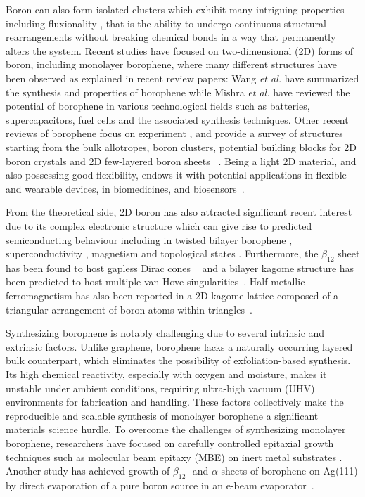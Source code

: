 \documentclass[aps,prb,preprint,notitlepage]{revtex4-2}
\begin{document}
Boron can also form isolated clusters which exhibit many intriguing properties including fluxionality \cite{pan2019fluxional}, that is
the ability to
undergo continuous structural rearrangements without breaking chemical 
bonds in a way that permanently alters the system.
Recent studies have focused on two-dimensional (2D) forms of boron, 
including monolayer borophene, where many different structures have been observed as explained in recent review papers: Wang {\em et al.} \cite{ wang2024borophene} have summarized the synthesis and properties of borophene while Mishra {\em et al. }
\cite{mishra2024borophene}
 have reviewed the potential of borophene in various technological fields such as batteries, supercapacitors, fuel cells and the associated synthesis techniques. Other recent reviews of borophene focus on experiment \cite{mohanty2023review,yang2023borophenes,kumar2024rise, xie2020two}, and provide a survey of structures starting from the bulk allotropes, boron clusters, potential building blocks for 2D boron crystals and 2D few-layered boron sheets ~\cite{sun2017two}.
Being a light 2D material, and also possessing good flexibility, 
endows it with potential applications in flexible and wearable devices, 
in biomedicines, and 
biosensors~\cite{mozvashi2021mechanical,zhang2017elasticity}.

From the theoretical side, 2D boron has also attracted significant recent interest due to its complex electronic structure which can give rise to predicted semiconducting 
behaviour \cite{qureshi2024bilayer} including in twisted bilayer borophene \cite{jin2022tuning}, superconductivity \cite{gao2017prediction,han2023superconducting}, magnetism \cite{zhu2019magnetic}  and topological states
\cite{wang2025second,rakshit2025exploring,wang2019serendipity}.  
Furthermore, the $\beta_{12}$ sheet has been found to host gapless Dirac cones
~\cite{feng2017dirac} and a bilayer kagome structure has been predicted to host
multiple van Hove singularities~\cite{gao2024bilayer}.
Half-metallic ferromagnetism has also been reported in a 2D kagome lattice 
composed of a triangular arrangement of boron atoms within 
triangles~\cite{kim2017boron}.



Synthesizing borophene is notably challenging due to several intrinsic and extrinsic factors. Unlike graphene, borophene lacks a naturally occurring layered bulk counterpart, which eliminates the possibility of exfoliation-based synthesis. Its high chemical reactivity, especially with oxygen and moisture, makes it unstable under ambient conditions, requiring 
ultra-high vacuum (UHV) environments for fabrication and handling. These factors collectively make the reproducible and scalable synthesis of monolayer 
borophene a significant materials science hurdle.
To overcome the challenges of synthesizing monolayer borophene, researchers have focused on carefully controlled epitaxial growth techniques such as molecular beam epitaxy (MBE) on inert metal substrates \cite{chen2022synthesis}. 
Another study has achieved growth of $\beta_{12}$- and $\alpha$-sheets of 
borophene on Ag(111) by direct evaporation of a pure boron source in an e-beam evaporator~\cite{zhong2017metastable}.
\end{document}
